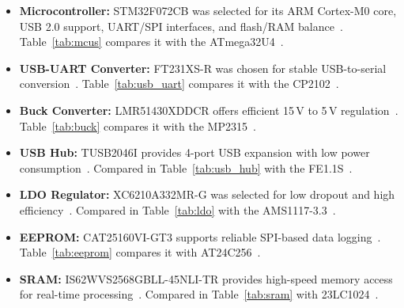 \documentclass[12pt]{article}
\begin{document}
\begin{itemize}
    \item \textbf{Microcontroller:} STM32F072CB was selected for its ARM Cortex-M0 core, USB 2.0 support, UART/SPI interfaces, and flash/RAM balance~\cite{stm2023}. Table~\ref{tab:mcus} compares it with the ATmega32U4~\cite{atmel2023}.

    \item \textbf{USB-UART Converter:} FT231XS-R was chosen for stable USB-to-serial conversion~\cite{ftdi2023}. Table~\ref{tab:usb_uart} compares it with the CP2102~\cite{silabs2023}.

    \item \textbf{Buck Converter:} LMR51430XDDCR offers efficient 15\,V to 5\,V regulation~\cite{ti2023b}. Table~\ref{tab:buck} compares it with the MP2315~\cite{mp2315}.

    \item \textbf{USB Hub:} TUSB2046I provides 4-port USB expansion with low power consumption~\cite{ti2023a}. Compared in Table~\ref{tab:usb_hub} with the FE1.1S~\cite{fe1hub}.

    \item \textbf{LDO Regulator:} XC6210A332MR-G was selected for low dropout and high efficiency~\cite{torex2023}. Compared in Table~\ref{tab:ldo} with the AMS1117-3.3~\cite{ams1117}.

    \item \textbf{EEPROM:} CAT25160VI-GT3 supports reliable SPI-based data logging~\cite{onsemi2023}. Table~\ref{tab:eeprom} compares it with AT24C256~\cite{at24c256}.

    \item \textbf{SRAM:} IS62WVS2568GBLL-45NLI-TR provides high-speed memory access for real-time processing~\cite{issi2023}. Compared in Table~\ref{tab:sram} with 23LC1024~\cite{microchip2023}.
\end{itemize}
\end{document}
